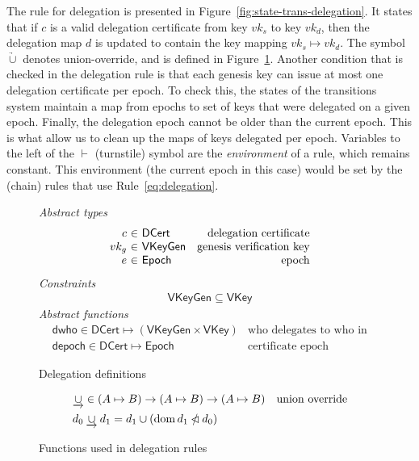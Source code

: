 \documentclass[11pt,a4paper]{article}
\DeclareMathOperator{\dom}{dom}
\newcommand{\restrictdom}{\lhd}
\newcommand{\subtractdom}{\mathbin{\slashed{\restrictdom}}}
\newcommand{\unionoverride}{\mathbin{\underrightarrow\cup}}
\newcommand{\var}[1]{\mathit{#1}}
\newcommand{\fun}[1]{\mathsf{#1}}
\newcommand{\type}[1]{\mathsf{#1}}
\newcommand{\VKey}{\type{VKey}}
\newcommand{\DCert}{\type{DCert}}
\newcommand{\Epoch}{\type{Epoch}}
\newcommand{\VKeyGen}{\type{VKeyGen}}
\begin{document}
The rule for delegation is presented in
Figure~\ref{fig:state-trans-delegation}. It states that if $\var{c}$ is a valid
delegation certificate from key $\var{vk}_s$ to key $\var{vk}_d$, then the
delegation map $d$ is updated to contain the key mapping
$\var{vk}_s \mapsto \var{vk}_d$. The symbol $\unionoverride$ denotes
union-override, and is defined in Figure~\ref{fig:delegation-defs}. Another
condition that is checked in the delegation rule is that each genesis key can
issue at most one delegation certificate per epoch. To check this, the states
of the transitions system maintain a map from epochs to set of keys that were
delegated on a given epoch. Finally, the delegation epoch cannot be older than
the current epoch. This is what allow us to clean up the maps of keys delegated
per epoch. Variables to the left of the $\vdash$ (turnstile) symbol are the
\textit{environment} of a rule, which remains constant. This environment (the
current epoch in this case) would be set by the (chain) rules that use
Rule~\ref{eq:delegation}.

\begin{figure}
  \emph{Abstract types}
  \begin{equation*}
    \begin{array}{r@{~\in~}lr}
      c & \DCert & \text{delegation certificate}\\
      vk_g & \VKeyGen & \text{genesis verification key}\\
      e & \Epoch & \text{epoch}\\
    \end{array}
  \end{equation*}
  \emph{Constraints}
  \begin{align*}
    \VKeyGen \subseteq \VKey
  \end{align*}
  \emph{Abstract functions}
  \begin{align*}
    & \fun{dwho} \in \DCert \mapsto (\VKeyGen \times \VKey) & \text{who delegates to who in the certificate}\\
    & \fun{depoch} \in \DCert \mapsto \Epoch & \text{certificate epoch}
  \end{align*}
  \caption{Delegation definitions}
  \label{fig:delegation-defs}
\end{figure}

\begin{figure}
  \begin{align*}
    & \unionoverride \in (A \mapsto B) \to (A \mapsto B) \to (A \mapsto B)
    & \text{union override}\\
    & d_0 \unionoverride d_1 = d_1 \cup (\dom d_1 \subtractdom d_0)
  \end{align*}
  \caption{Functions used in delegation rules}
  \label{fig:delegation-funcs}
\end{figure}
\end{document}
